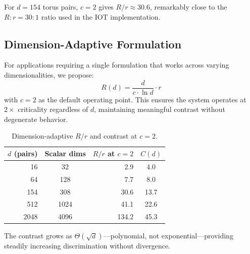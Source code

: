 For $d = 154$ torus pairs, $c = 2$ gives $R/r \approx 30.6$, remarkably close to the $R{:}r = 30{:}1$ ratio used in the IOT implementation.

\subsection{Dimension-Adaptive Formulation}

For applications requiring a single formulation that works across varying dimensionalities, we propose:
\begin{equation}
    R(d) = \frac{d}{c \cdot \ln d} \cdot r
    \label{eq:adaptive}
\end{equation}
with $c = 2$ as the default operating point. This ensures the system operates at $2\times$ criticality regardless of $d$, maintaining meaningful contrast without degenerate behavior.

\begin{table}[h]
\centering
\footnotesize
\begin{tabular}{@{}rcrc@{}}
\toprule
$d$ (pairs) & Scalar dims & $R/r$ at $c\!=\!2$ & $C(d)$ \\
\midrule
16 & 32 & 2.9 & 4.0 \\
64 & 128 & 7.7 & 8.0 \\
154 & 308 & 30.6 & 13.7 \\
512 & 1024 & 41.1 & 22.6 \\
2048 & 4096 & 134.2 & 45.3 \\
\bottomrule
\end{tabular}
\caption{Dimension-adaptive $R/r$ and contrast at $c = 2$.}
\label{tab:adaptive}
\end{table}

The contrast grows as $\Theta(\sqrt{d})$---polynomial, not exponential---providing steadily increasing discrimination without divergence.
